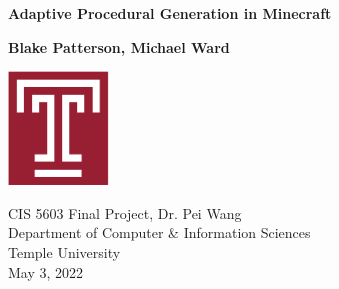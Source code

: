 \documentclass[11pt, oneside]{article}
\begin{document}
\begin{titlepage}
    \begin{center}
        \vspace*{1cm}
            
        \Huge
        \textbf{Adaptive Procedural Generation in Minecraft}
            
        \vspace{0.5cm}
        \LARGE

            
        \vspace{1.5cm}
            
        \textbf{Blake Patterson, Michael Ward}
            
        \vfill
            
            
        \vspace{0.8cm}
            
        \includegraphics[width=0.2\textwidth]{temple}
            
        \Large
        CIS 5603 Final Project, Dr. Pei Wang \\
        Department of Computer \& Information Sciences\\
        Temple University\\
        May 3, 2022
            
    \end{center}
\end{titlepage}

\newpage
\tableofcontents
\newpage
{}
\end{document}
